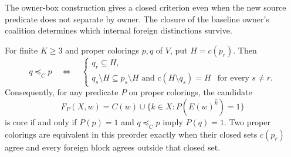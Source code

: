 The owner-box construction gives a closed criterion even when the new
source predicate does not separate by owner. The closure of the baseline
owner's coalition determines which internal foreign distinctions survive.

\begin{theorem}
\label{core:thm:one-owner-activation-order}
For finite $K\geq3$ and proper colorings $p,q$ of $V$, put $H=c(p_r)$. Then
\[
 q\preceq_C p\quad\Longleftrightarrow\quad
 \begin{cases}
 q_r\subseteq H,\\
 q_s\setminus H\subseteq p_s\setminus H
      \text{ and }c(H\setminus q_s)=H&\text{for every }s\ne r.
 \end{cases}
\]
Consequently, for any predicate $P$ on proper colorings, the candidate
\[
 F_P(X,w)=C(w)\cup
       \{k\in X:P(E(w)^{\widehat k})=1\}
\]
is core if and only if $P(p)=1$ and $q\preceq_C p$ imply $P(q)=1$.
Two proper colorings are equivalent in this preorder exactly when their
closed sets $c(p_r)$ agree and every foreign block agrees outside that
closed set.
\end{theorem}

